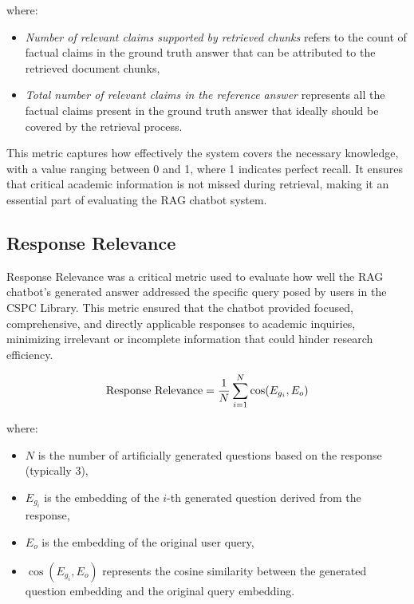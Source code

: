 \begin{refsection}
where:

\begin{itemize}
    \item \textit{Number of relevant claims supported by retrieved chunks} refers to the count of factual claims in the ground truth answer that can be attributed to the retrieved document chunks,
    \item \textit{Total number of relevant claims in the reference answer} represents all the factual claims present in the ground truth answer that ideally should be covered by the retrieval process.
\end{itemize}

This metric captures how effectively the system covers the necessary knowledge, with a value ranging between 0 and 1, where 1 indicates perfect recall. It ensures that critical academic information is not missed during retrieval, making it an essential part of evaluating the RAG chatbot system.


\subsection*{Response Relevance}

Response Relevance was a critical metric used to evaluate how well the RAG chatbot's generated answer addressed the specific query posed by users in the CSPC Library. This metric ensured that the chatbot provided focused, comprehensive, and directly applicable responses to academic inquiries, minimizing irrelevant or incomplete information that could hinder research efficiency.

\begin{equation}
\centering
\text{Response Relevance} = \frac{1}{N} \sum_{i=1}^{N} \cos(E_{g_i}, E_o)
\end{equation}

where:
\begin{itemize}
    \item $N$ is the number of artificially generated questions based on the response (typically 3),
    \item $E_{g_i}$ is the embedding of the $i$-th generated question derived from the response,
    \item $E_o$ is the embedding of the original user query,
    \item $\cos(E_{g_i}, E_o)$ represents the cosine similarity between the generated question embedding and the original query embedding.
\end{itemize}


\end{refsection}
